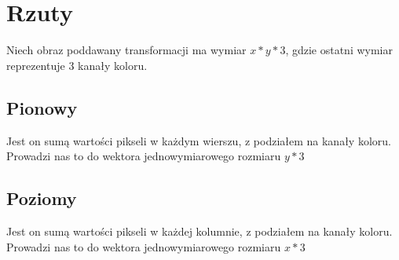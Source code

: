 \documentclass[a4paper]{article}
\begin{document}
\section{Rzuty}

Niech obraz poddawany transformacji ma wymiar $x*y*3$, gdzie ostatni wymiar reprezentuje 3 kanały koloru.

\subsection{Pionowy}
Jest on sumą wartości pikseli w każdym wierszu, z podziałem na kanały koloru. Prowadzi nas to do wektora jednowymiarowego rozmiaru $y*3$

\subsection{Poziomy}
Jest on sumą wartości pikseli w każdej kolumnie, z podziałem na kanały koloru. Prowadzi nas to do wektora jednowymiarowego rozmiaru $x*3$
\end{document}
